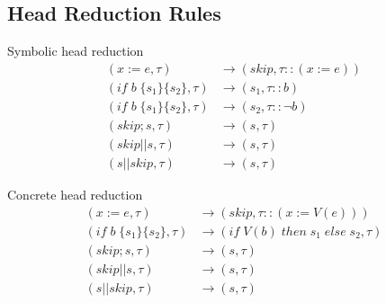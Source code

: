 \documentclass[submission,copyright,creativecommons]{eptcs}
\begin{document}
\subsection{Head Reduction Rules}
\noindent\begin{minipage}{.5\linewidth}
\centering
Symbolic head reduction
\begin{align*}
  (x := e, \tau) & \rightarrow (skip, \tau :: (x := e)) \\
  (if \;b\; \{s_{1}\} \{s_{2}\}, \tau) & \rightarrow (s_{1}, \tau :: b) \\
  (if \;b\; \{s_{1}\} \{s_{2}\}, \tau) & \rightarrow (s_{2}, \tau :: \neg b) \\
  (skip ; s, \tau) & \rightarrow (s, \tau) \\
  (skip |\!| s, \tau) & \rightarrow (s, \tau) \\
  (s |\!| skip, \tau) & \rightarrow (s, \tau)
\end{align*}
\end{minipage}%
\begin{minipage}{.5\linewidth}
\centering
Concrete head reduction
\begin{align*}
  (x := e, \tau) & \rightarrow (skip, \tau :: (x := V(e))) \\
  (if \;b\; \{s_{1}\} \{s_{2}\}, \tau) & \rightarrow (if \; V (b) \; then \; s_{1} \; else \; s_{2}, \tau) \\
  (skip ; s, \tau) & \rightarrow (s, \tau) \\
  (skip |\!| s, \tau) & \rightarrow (s, \tau) \\
  (s |\!| skip, \tau) & \rightarrow (s, \tau)
\end{align*}
\end{minipage}
\end{document}
